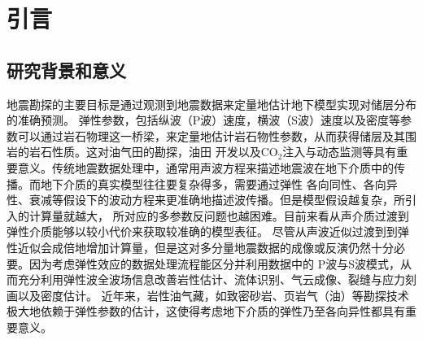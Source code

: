 \chapter{引言}
\section{研究背景和意义}
地震勘探的主要目标是通过观测到地震数据来定量地估计地下模型实现对储层分布的准确预测。
弹性参数，包括纵波（P波）速度，横波（S波）速度以及密度等参数可以通过岩石物理这一桥梁，来定量地估计岩石物性参数，从而获得储层及其围岩的岩石性质。这对油气田的勘探，油田
开发以及CO$_2$注入与动态监测等具有重要意义。传统地震数据处理中，通常用声波方程来描述地震波在地下介质中的传播。而地下介质的真实模型往往要复杂得多，需要通过弹性
各向同性、各向异性、衰减等假设下的波动方程来更准确地描述波传播。但是模型假设越复杂，所引入的计算量就越大，
所对应的多参数反问题也越困难。目前来看从声介质过渡到弹性介质能够以较小代价来获取较准确的模型表征。
尽管从声波近似过渡到到弹性近似会成倍地增加计算量，但是这对多分量地震数据的成像或反演仍然十分必要。因为考虑弹性效应的数据处理流程能区分并利用数据中的
P波与S波模式，从而充分利用弹性波全波场信息改善岩性估计、流体识别、气云成像、裂缝与应力刻画以及密度估计。
近年来，岩性油气藏，如致密砂岩、页岩气（油）等勘探技术极大地依赖于弹性参数的估计，这使得考虑地下介质的弹性乃至各向异性都具有重要意义。

